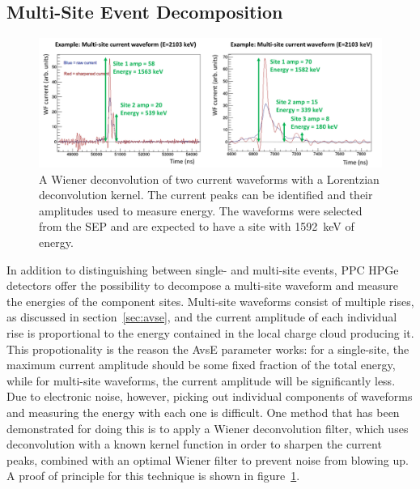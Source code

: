 \documentclass[/main.tex]{subfiles}
\begin{document}
  \subsection{Multi-Site Event Decomposition}
\begin{figure}[h]
  \centering
  \includegraphics[width=\textwidth]{wienercurrent}
  \caption[Proof of principle for multi-site event decomposition]{\label{fig:wienercurrent}
    A Wiener deconvolution of two current waveforms with a Lorentzian deconvolution kernel. The current peaks can be identified and their amplitudes used to measure energy. The waveforms were selected from the SEP and are expected to have a site with 1592~keV of energy.
  }
\end{figure}
In addition to distinguishing between single- and multi-site events, PPC HPGe detectors offer the possibility to decompose a multi-site waveform and measure the energies of the component sites.
Multi-site waveforms consist of multiple rises, as discussed in section~\ref{sec:avse}, and the current amplitude of each individual rise is proportional to the energy contained in the local charge cloud producing it.
This propotionality is the reason the AvsE parameter works: for a single-site, the maximum current amplitude should be some fixed fraction of the total energy, while for multi-site waveforms, the current amplitude will be significantly less.
Due to electronic noise, however, picking out individual components of waveforms and measuring the energy with each one is difficult.
One method that has been demonstrated for doing this is to apply a Wiener deconvolution filter, which uses deconvolution with a known kernel function in order to sharpen the current peaks, combined with an optimal Wiener filter to prevent noise from blowing up.
A proof of principle for this technique is shown in figure~\ref{fig:wienercurrent}.
\\
\end{document}
